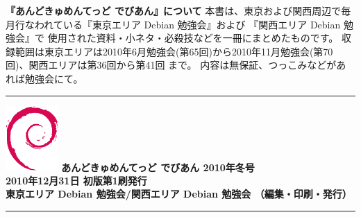 \documentclass[mingoth,a4paper]{jsarticle}
\begin{document}


\printindex


\newpage
\thispagestyle{empty}\mbox{}
\newpage

\thispagestyle{empty} 
{
\large
\begin{itembox}{\bf 『あんどきゅめんてっど でびあん』について}
本書は、東京および関西周辺で毎月行なわれている『東京エリア Debian 勉強会』および
『関西エリア Debian 勉強会』で
使用された資料・小ネタ・必殺技などを一冊にまとめたものです。
収録範囲は東京エリアは2010年6月勉強会(第65回)から2010年11月勉強会(第70回)、関西エリアは第36回から第41回 まで。
内容は無保証、つっこみなどがあれば勉強会にて。
\end{itembox}
}

\vspace*{15cm}
{\color{dancerlightblue}\rule{\hsize}{1mm}}
\vspace{2mm}
\includegraphics[width=2cm]{image200502/openlogo-nd.eps}
\noindent \Large \bf あんどきゅめんてっど でびあん 2010年冬号\\
\noindent \normalfont 2010年12月31日 \hspace{5mm}  初版第1刷発行\\
\noindent \normalfont 東京エリア Debian 勉強会/関西エリア Debian 勉強会 （編集・印刷・発行）\\
{\color{dancerdarkblue}\rule{\hsize}{1mm}}
\end{document}
